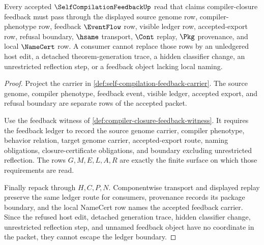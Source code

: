 \begin{theorem}
\label{thm:self-compilation-feedback-ledger-nonescape}
Every accepted $\SelfCompilationFeedbackUp$ read that claims compiler-closure feedback must pass through the displayed source genome row, compiler-phenotype row, feedback $\EventFlow$ row, visible ledger row, accepted-export row, refusal boundary, $\hsame$ transport, $\Cont$ replay, $\Pkg$ provenance, and local $\NameCert$ row. A consumer cannot replace those rows by an unledgered host edit, a detached theorem-generation trace, a hidden classifier change, an unrestricted reflection step, or a feedback object lacking local naming.
\end{theorem}
\begin{proof}
Project the carrier in \autoref{def:self-compilation-feedback-carrier}. The source genome, compiler phenotype, feedback event, visible ledger, accepted export, and refusal boundary are separate rows of the accepted packet.

Use the feedback witness of \autoref{def:compiler-closure-feedback-witness}. It requires the feedback ledger to record the source genome carrier, compiler phenotype, behavior relation, target genome carrier, accepted-export route, naming obligations, closure-certificate obligations, and boundary excluding unrestricted reflection. The rows $G,M,E,L,A,R$ are exactly the finite surface on which those requirements are read.

Finally repack through $H,C,P,N$. Componentwise transport and displayed replay preserve the same ledger route for consumers, provenance records its package boundary, and the local NameCert row names the accepted feedback carrier. Since the refused host edit, detached generation trace, hidden classifier change, unrestricted reflection step, and unnamed feedback object have no coordinate in the packet, they cannot escape the ledger boundary.
\end{proof}

